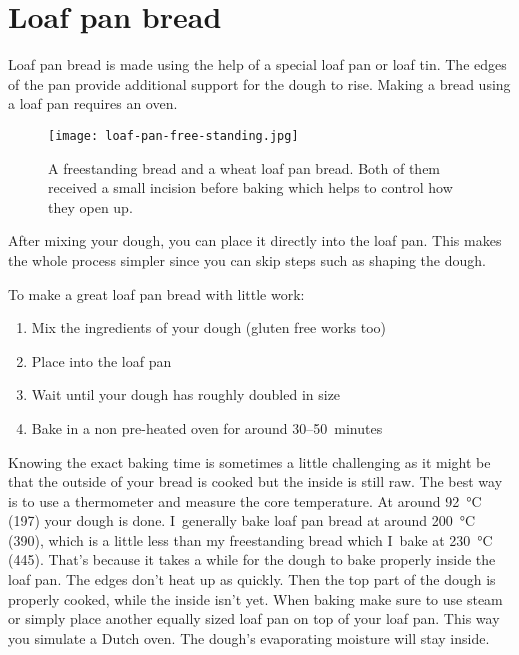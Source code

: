 \section{Loaf pan bread}

Loaf pan bread is made using the help of a special loaf pan
or loaf tin. The edges of the pan provide additional support
for the dough to rise. Making a bread using a loaf pan requires
an oven.

\begin{figure}[!htb]
  \texttt{[image: loaf-pan-free-standing.jpg]}
  \caption{A freestanding bread and a wheat loaf pan bread. Both of them
  received a small incision before baking which helps to control how they open up.}%
  \label{fig:free-standing-loaf-pan}
\end{figure}

After mixing your dough, you can place it directly into the loaf pan.
This makes the whole process simpler since you can skip steps such
as shaping the dough.

To make a great loaf pan bread with little work:

\begin{enumerate}
    \item Mix the ingredients of your dough (gluten free works too)
    \item Place into the loaf pan
    \item Wait until your dough has roughly doubled in size
    \item Bake in a non pre-heated oven for around 30--50~minutes
\end{enumerate}

Knowing the exact baking time is sometimes a little challenging
as it might be that the outside of your bread is cooked but
the inside is still raw. The best way is to use a thermometer
and measure the core temperature. At around  \qty{92}{\degreeCelsius}
(\qty{197}{\degF}) your dough is done. I~generally bake loaf pan bread at
around  \qty{200}{\degreeCelsius} (\qty{390}{\degF}), which is a little less
than my freestanding bread which I~bake at  \qty{230}{\degreeCelsius}
(\qty{445}{\degF}). That's because it takes a while for the dough
to bake properly inside the loaf pan. The edges don't heat up
as quickly. Then the top part of the dough is properly cooked, while
the inside isn't yet. When baking make sure to use steam
or simply place another equally sized loaf pan on top
of your loaf pan. This way you simulate a Dutch oven. The dough's
evaporating moisture will stay inside.

